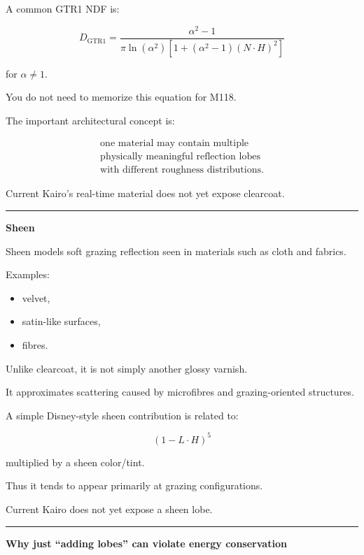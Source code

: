 A common GTR1 NDF is:

\[
D_{\mathrm{GTR1}}
=
\frac{
\alpha^2-1
}{
\pi
\ln(\alpha^2)
\left[
1+(\alpha^2-1)(N\cdot H)^2
\right]
}
\]

for \(\alpha\neq1\).

You do not need to memorize this equation for M118.

The important architectural concept is:

\[\boxed{\begin{gathered}\text{one material may contain multiple}\\\text{physically meaningful reflection lobes}\\\text{with different roughness distributions}.\end{gathered}}\]

Current Kairo's real-time material does not yet expose clearcoat.

\begin{center}\rule{0.5\linewidth}{0.5pt}\end{center}

\textbf{Sheen}

Sheen models soft grazing reflection seen in materials such as cloth and fabrics.

Examples:

\begin{itemize}
\tightlist
\item
  velvet,
\item
  satin-like surfaces,
\item
  fibres.
\end{itemize}

Unlike clearcoat, it is not simply another glossy varnish.

It approximates scattering caused by microfibres and grazing-oriented structures.

A simple Disney-style sheen contribution is related to:

\[
(1-L\cdot H)^5
\]

multiplied by a sheen color/tint.

Thus it tends to appear primarily at grazing configurations.

Current Kairo does not yet expose a sheen lobe.

\begin{center}\rule{0.5\linewidth}{0.5pt}\end{center}

\textbf{Why just ``adding lobes'' can violate energy conservation}

